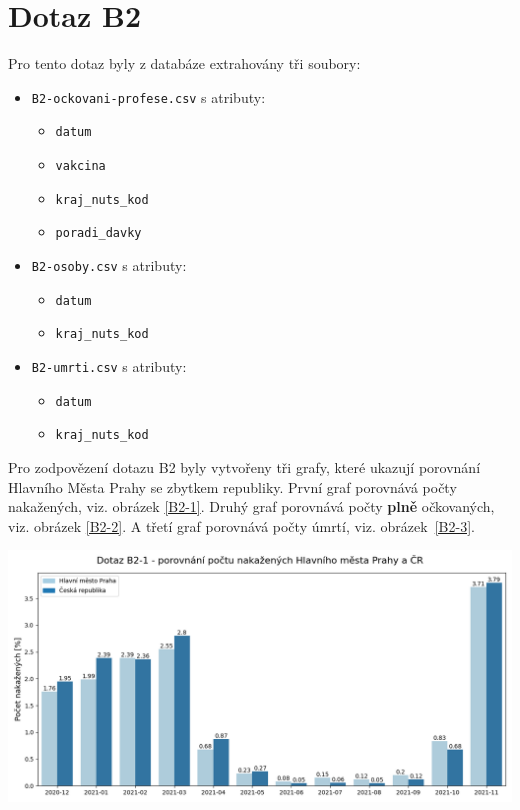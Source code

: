 \documentclass[12pt]{article}
\begin{document}
\section{Dotaz B2}
Pro tento dotaz byly z databáze extrahovány tři soubory:
\begin{itemize}
    \item \texttt{B2-ockovani-profese.csv} s atributy:
        \begin{itemize}
            \item \texttt{datum}
            \item \texttt{vakcina}
            \item \texttt{kraj\_nuts\_kod}
            \item \texttt{poradi\_davky}
        \end{itemize}
    \item \texttt{B2-osoby.csv} s atributy:
        \begin{itemize}
            \item \texttt{datum}
            \item \texttt{kraj\_nuts\_kod}
        \end{itemize}
    \item \texttt{B2-umrti.csv} s atributy:
        \begin{itemize}
            \item \texttt{datum}
            \item \texttt{kraj\_nuts\_kod}
        \end{itemize}
\end{itemize}


Pro zodpovězení dotazu B2 byly vytvořeny tři grafy, které ukazují porovnání Hlavního Města Prahy se zbytkem republiky. První graf porovnává počty nakažených, viz. obrázek \ref{B2-1}. Druhý graf porovnává počty \textbf{plně} očkovaných, viz. obrázek \ref{B2-2}. A třetí graf porovnává počty úmrtí, viz. obrázek~\ref{B2-3}.

\begin{center}
    \includegraphics[width=0.7\paperwidth]{B2-nakazeni.png}
    \label{B2-1}
\end{center}
\end{document}
